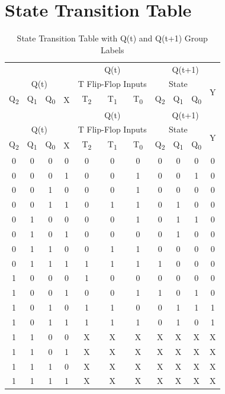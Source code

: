 \documentclass[a4paper,12pt]{article}
\begin{document}
\section{State Transition Table}
\begin{longtable}{|c|c|c|c||c|c|c||c|c|c|c|}
\caption{State Transition Table with Q(t) and Q(t+1) Group Labels} \\
\hline
\multicolumn{4}{|c||}{} & \multicolumn{3}{c||}{Q(t)} & \multicolumn{4}{c|}{Q(t+1)} \\
\multicolumn{4}{|c||}{Q(t)} & \multicolumn{3}{c||}{T Flip-Flop Inputs} & \multicolumn{3}{c|}{State} & \multirow{2}{*}{Y} \\
Q\textsubscript{2} & Q\textsubscript{1} & Q\textsubscript{0} & X & T\textsubscript{2} & T\textsubscript{1} & T\textsubscript{0} & Q\textsubscript{2} & Q\textsubscript{1} & Q\textsubscript{0} & \\
\hline
\endfirsthead

\hline
\multicolumn{4}{|c||}{} & \multicolumn{3}{c||}{Q(t)} & \multicolumn{4}{c|}{Q(t+1)} \\
\multicolumn{4}{|c||}{Q(t)} & \multicolumn{3}{c||}{T Flip-Flop Inputs} & \multicolumn{3}{c|}{State} & \multirow{2}{*}{Y} \\
Q\textsubscript{2} & Q\textsubscript{1} & Q\textsubscript{0} & X & T\textsubscript{2} & T\textsubscript{1} & T\textsubscript{0} & Q\textsubscript{2} & Q\textsubscript{1} & Q\textsubscript{0} & \\
\hline
\endhead

\hline
\endfoot

\hline
\endlastfoot

0 & 0 & 0 & 0 & 0 & 0 & 0 & 0 & 0 & 0 & 0 \\
0 & 0 & 0 & 1 & 0 & 0 & 1 & 0 & 0 & 1 & 0 \\
\hline
0 & 0 & 1 & 0 & 0 & 0 & 1 & 0 & 0 & 0 & 0 \\
0 & 0 & 1 & 1 & 0 & 1 & 1 & 0 & 1 & 0 & 0 \\
\hline
0 & 1 & 0 & 0 & 0 & 0 & 1 & 0 & 1 & 1 & 0 \\
0 & 1 & 0 & 1 & 0 & 0 & 0 & 0 & 1 & 0 & 0 \\
\hline
0 & 1 & 1 & 0 & 0 & 1 & 1 & 0 & 0 & 0 & 0 \\
0 & 1 & 1 & 1 & 1 & 1 & 1 & 1 & 0 & 0 & 0 \\
\hline
1 & 0 & 0 & 0 & 1 & 0 & 0 & 0 & 0 & 0 & 0 \\
1 & 0 & 0 & 1 & 0 & 0 & 1 & 1 & 0 & 1 & 0 \\
\hline
1 & 0 & 1 & 0 & 1 & 1 & 0 & 0 & 1 & 1 & 1 \\
1 & 0 & 1 & 1 & 1 & 1 & 1 & 0 & 1 & 0 & 1 \\
\hline
1 & 1 & 0 & 0 & X & X & X & X & X & X & X \\
1 & 1 & 0 & 1 & X & X & X & X & X & X & X \\
\hline
1 & 1 & 1 & 0 & X & X & X & X & X & X & X \\
1 & 1 & 1 & 1 & X & X & X & X & X & X & X \\
\end{longtable}
\end{document}
